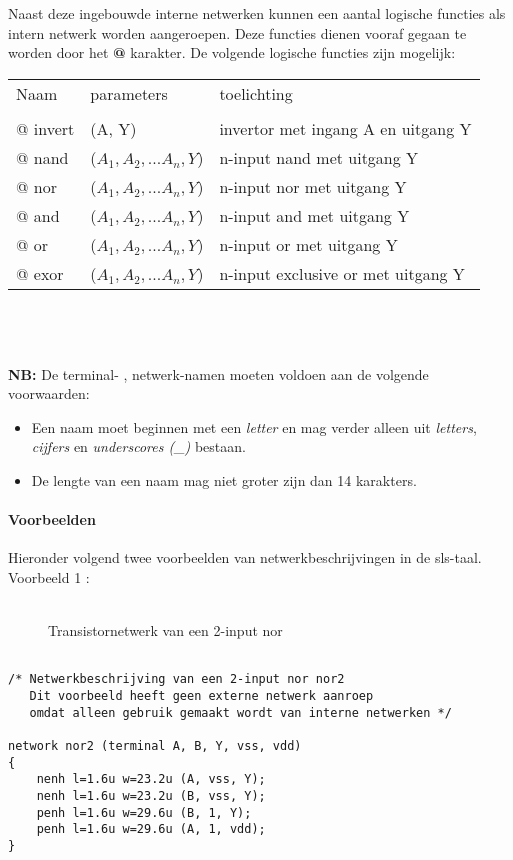 Naast deze ingebouwde interne netwerken kunnen een aantal logische functies
als intern netwerk worden aangeroepen.
Deze functies dienen vooraf gegaan te worden door het {\bf @} karakter.
De volgende logische functies zijn mogelijk:\\
\begin{tabular}{lll}
\\
Naam & parameters & toelichting\\
\\
@ invert & (A, Y) & invertor met ingang A en uitgang Y\\
@ nand & ($A_1, A_2,...A_n, Y$) & n-input nand met uitgang Y\\
@ nor & ($A_1, A_2,...A_n, Y$) & n-input nor met uitgang Y\\
@ and & ($A_1, A_2,...A_n, Y$) & n-input and met uitgang Y\\
@ or & ($A_1, A_2,...A_n, Y$) & n-input or met uitgang Y\\
@ exor & ($A_1, A_2,...A_n, Y$) & n-input exclusive or met uitgang Y\\
\end{tabular}
\\
\\
\\
{\bf NB:} De terminal- , netwerk-namen moeten voldoen aan
de volgende voorwaarden:
\begin{itemize}
\item
Een naam moet beginnen met een {\it letter} en mag verder alleen uit
{\it letters}, {\it cijfers} en {\it underscores (\_)} bestaan.
\item
De lengte van een naam mag niet groter zijn dan 14 karakters.
\end{itemize}
\clearpage

\paragraph{Voorbeelden} Hieronder volgend twee voorbeelden van netwerkbeschrijvingen
in de sls-taal.\\

Voorbeeld 1 :\\
\\

\begin{figure}[thb]
\centerline{}
\caption{\label{nor} Transistornetwerk van een 2-input nor}
\end{figure}

\begin{verbatim}

/* Netwerkbeschrijving van een 2-input nor nor2
   Dit voorbeeld heeft geen externe netwerk aanroep
   omdat alleen gebruik gemaakt wordt van interne netwerken */

network nor2 (terminal A, B, Y, vss, vdd)
{
    nenh l=1.6u w=23.2u (A, vss, Y);
    nenh l=1.6u w=23.2u (B, vss, Y);
    penh l=1.6u w=29.6u (B, 1, Y);
    penh l=1.6u w=29.6u (A, 1, vdd); 
}

\end{verbatim}

